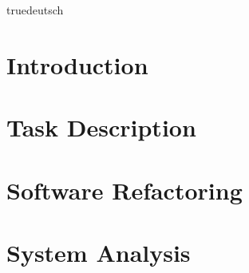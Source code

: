 \documentclass[a4paper,fleqn,english]{book}
\begin{document}

\zusammenfassung%
{truedeutsch} %
{} %
{} %





\mainmatter%
\pagestyle{fancy}%
\chapter{Introduction}

%
\chapter{Task Description}%
%
%
\chapter{Software Refactoring}%
%
%
\chapter{System Analysis}

%
\end{document}

